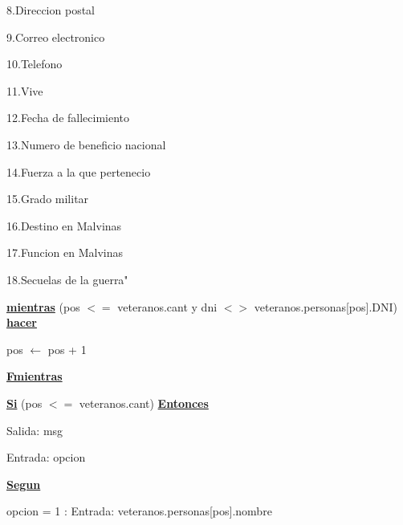 \documentclass{article}
\begin{document}
                \hspace{25mm}8.Direccion postal

                \hspace{25mm}9.Correo electronico

                \hspace{25mm}10.Telefono

                \hspace{25mm}11.Vive

                \hspace{25mm}12.Fecha de fallecimiento

                \hspace{25mm}13.Numero de beneficio nacional

                \hspace{25mm}14.Fuerza a la que pertenecio

                \hspace{25mm}15.Grado militar

                \hspace{25mm}16.Destino en Malvinas

                \hspace{25mm}17.Funcion en Malvinas

                \hspace{25mm}18.Secuelas de la guerra"

            \hspace{12mm}\underline{\textbf{mientras}} (pos $<=$ veteranos.cant y dni $<>$ veteranos.personas[pos].DNI) \underline{\textbf{hacer}}

                \hspace{16mm}pos $\leftarrow$ pos + 1

            \hspace{12mm}\underline{\textbf{Fmientras}}

            \hspace{12mm}\underline{\textbf{Si}} (pos $<=$ veteranos.cant) \underline{\textbf{Entonces}}

                \hspace{16mm} Salida: msg

                \hspace{16mm}Entrada: opcion

                \hspace{16mm}\underline{\textbf{Segun}}

                    \hspace{20mm}opcion = 1 : Entrada: veteranos.personas[pos].nombre
\end{document}
